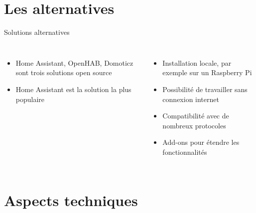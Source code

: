 \documentclass[aspectratio=169,xcolor=dvipsnames]{beamer}
\begin{document}
\section{Les alternatives}

\begin{frame}{Solutions alternatives}
    \begin{columns}[c] %

        \begin{itemize}
            \item Home Assistant, OpenHAB, Domoticz sont trois solutions open source
            \item Home Assistant est la solution la plus populaire
        \end{itemize}
        \vspace{1cm}
        \begin{itemize}
            \item Installation locale, par exemple sur un Raspberry Pi
            \item Possibilité de travailler sans connexion internet
            \item Compatibilité avec de nombreux protocoles
            \item Add-ons pour étendre les fonctionnalités
        \end{itemize}

    \end{columns}
\end{frame}

\section{Aspects techniques}
\end{document}
